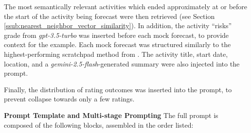 \documentclass[12pt,a4paper]{article}
\let\citep\parencite
\newcommand{\subsubsubsection}[1]{\paragraph{#1}\mbox{}\\}
\begin{document}
The most semantically relevant activities which ended approximately at or before the start of the activity being forecast were then retrieved (see Section \ref{ssub:nearest_neighbor_vector_similarity}). In addition, the activity ``risks'' grade from \emph{gpt-3.5-turbo} was inserted before each mock forecast, to provide context for the example. Each mock forecast was structured similarly to the highest-performing scratchpad method from \citep{halawiApproachingHumanLevelForecasting2024}.
The activity title, start date, location, and a \emph{gemini-2.5-flash}-generated summary were also injected into the prompt.


Finally, the distribution of rating outcomes was inserted into the prompt, to prevent collapse towards only a few ratings.

\textbf{Prompt Template and Multi-stage Prompting}
The full prompt is composed of the following blocks, assembled in the order listed:
\end{document}

